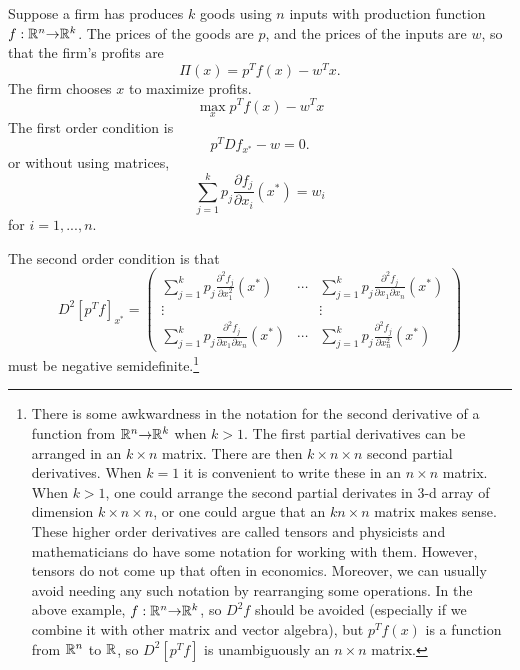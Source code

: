 \begin{example} 
  Suppose a firm has produces $k$ goods using $n$ inputs with production
  function $f: \mathbb{R}^n {\rightarrow} \mathbb{R}^k$. The prices of the goods are $p$, and the
  prices of the inputs are $w$, so that the firm's profits are 
  \[ \Pi(x) =  p^T f(x) -  w^Tx. \]
  The firm chooses $x$ to maximize profits.
  \[ \max_x p^T f(x) - w^T x \]
  The first order condition is
  \[ p^T Df_{x^*} - w = 0. \]
  or without using matrices,
  \[ \sum_{j=1}^k p_j \frac{\partial f_j}{\partial x_i}(x^*) = w_i \]
  for $i=1,..., n$. 

  The second order condition is that
  \[ D^2[p^T f]_{x^*} = \begin{pmatrix} \sum_{j=1}^k p_j \frac{\partial^2
      f_j}{\partial x_1^2}(x^*) & \cdots & \sum_{j=1}^k p_j \frac{\partial^2
      f_j}{\partial x_1\partial x_n}(x^*)  \\ \vdots & & \vdots \\
    \sum_{j=1}^k p_j \frac{\partial^2
      f_j}{\partial x_1\partial x_n}(x^*) & \cdots & \sum_{j=1}^k p_j
    \frac{\partial^2 f_j}{\partial x_n^2}(x^*) \end{pmatrix} 
  \]
  must be negative semidefinite.\footnote{There is some awkwardness in
    the notation for the second derivative of a function from $\mathbb{R}^n {\rightarrow}
    \mathbb{R}^k$ when $k>1$. The first partial derivatives can be arranged in
    an $k \times n$ matrix. There are then $k \times n \times n$ second
    partial derivatives. When $k=1$ it is convenient to write these in an
    $n \times n$ matrix. When $k>1$, one could arrange the second
    partial derivates in 3-d array of dimension $k \times n \times n$,
    or one could argue that an $kn \times n$ matrix makes
    sense. These higher order derivatives are called tensors and
    physicists and mathematicians do have some notation for working
    with them. However, tensors do not come up that often in
    economics. Moreover, we can usually avoid needing any such
    notation by rearranging some operations. In the above example,
    $f: \mathbb{R}^n {\rightarrow} \mathbb{R}^k$, so $D^2 f$ should be avoided (especially if we
    combine it with other matrix and vector algebra), but $p^T f(x)$
    is a function from $\mathbb{R}^n$ to $\mathbb{R}$, so $D^2[p^T f]$ is
    unambiguously an $n \times n$ matrix. }
\end{example}

